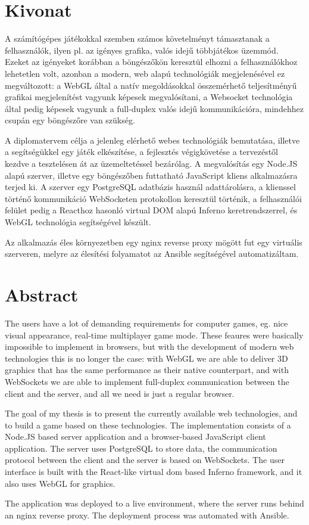 \chapter*{Kivonat}

A számítógépes játékokkal szemben számos követelményt támasztanak a
felhasználók, ilyen pl. az igényes grafika, valós idejű többjátékos üzemmód.
Ezeket az igényeket korábban a böngészőkön keresztül elhozni a felhasználókhoz
lehetetlen volt, azonban a modern, web alapú technológiák megjelenésével ez
megváltozott: a WebGL által a natív megoldásokkal összemérhető teljesítményű
grafikai megjelenítést vagyunk képesek megvalósítani, a Websocket technológia
által pedig képesek vagyunk a full-duplex valós idejű kommunikációra, mindehhez
csupán egy böngészőre van szükség.

A diplomatervem célja a jelenleg elérhető webes technológiák bemutatása, illetve
a segítségükkel egy játék elkészítése, a fejlesztés végigkövetése a tervezéstől
kezdve a tesztelésen át az üzemeltetéssel bezárólag. A megvalósítás egy Node.JS
alapú szerver, illetve egy böngészőben futtatható JavaScript kliens alkalmazásra
terjed ki. A szerver egy PostgreSQL adatbázis használ adattárolásra, a klienssel
történő kommunikáció WebSocketen protokollon keresztül történik, a felhasználói
felület pedig a Reacthoz hasonló virtual DOM alapú Inferno keretrendszerrel, és
WebGL technológia segítségével készült.

Az alkalmazás éles környezetben egy nginx reverse proxy mögött fut egy virtuális
szerveren, melyre az élesítési folyamatot az Ansible segítségével
automatizáltam.

\vfill

\chapter*{Abstract}

The users have a lot of demanding requirements for computer games, eg. nice
visual appearance, real-time multiplayer game mode.  These feaures were
basically impossible to implement in browsers, but with the development of
modern web technologies this is no longer the case: with WebGL we are able to
deliver 3D graphics that has the same performance as their native counterpart,
and with WebSockets we are able to implement full-duplex communication between
the client and the server, and all we need is just a regular browser.

The goal of my thesis is to present the currently available web technologies,
and to build a game based on these technologies. The implementation consists of
a Node.JS based server application and a browser-based JavaScript client
application. The server uses PostgreSQL to store data, the communication
protocol between the client and the server is based on WebSockets. The user
interface is built with the React-like virtual dom based Inferno framework, and
it also uses WebGL for graphics.

The application was deployed to a live environment, where the server runs behind
an nginx reverse proxy. The deployment process was automated with Ansible.

\vfill
